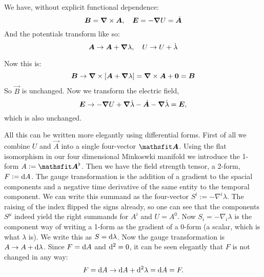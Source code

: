 \documentclass[11pt, ngerman, fleqn, DIV=15, headinclude, BCOR=1cm]{scrartcl}
\begin{document}
We have, without explicit functional dependence:
\[
    \boldsymbol{B} = \boldsymbol{\nabla} \times \boldsymbol{A}
    ,\quad
    \boldsymbol{E} = - \boldsymbol{\nabla} U = \dot{\boldsymbol{A}}
\]
And the potentials transform like so:
\[
    \boldsymbol{A} \to \boldsymbol{A} + \boldsymbol{\nabla} \lambda
    ,\quad
    U \to U + \dot \lambda
\]

Now this is:
\[
    \vec B \to \curl \sbr{\vec A + \vnabla \lambda} = \curl \vec A + \vec 0 =
    \vec B
\]
So $\vec B$ is unchanged. Now we transform the electric field,
\[
    \boldsymbol{E} \to - \boldsymbol{\nabla} U + \boldsymbol{\nabla} \dot \lambda - \dot{\boldsymbol{A}} - \boldsymbol{\nabla} \dot
    \lambda = \boldsymbol{E},
\]
which is also unchanged.

All this can be written more elegantly using differential forms. First of all
we combine $U$ and $\vec A$ into a single four-vector $\tens A$. Using the flat
isomorphism in our four dimensional Minkoswki manifold we introduce the 1-form
$A := \tens A^\flat$. Then we have the field strength tensor, a 2-form, $F :=
\dif A$. The gauge transformation is the addition of a gradient to the spacial
components and a negative time derivative of the same entity to the temporal
component. We can write this summand as the four-vector $S^i := - \nabla^i
\lambda$. The raising of the index flipped the signs already, so one can see
that the components $S^\mu$ indeed yield the right summands for $A^i$ and $U =
A^0$. Now $S_i = - \nabla_i \lambda$ is the component way of writing a 1-form
as the gradient of a 0-form (a scalar, which is what $\lambda$ is). We write
this as $S = \dif \lambda$. Now the gauge transformation is $A \to A + \dif
\lambda$. Since $F = \dif A$ and $\dif{^2} = 0$, it can be seen elegantly that
$F$ is not changed in any way:
\[
    F = \dif A \to \dif A + \dif{^2} \lambda = \dif A = F.
\]
\end{document}
